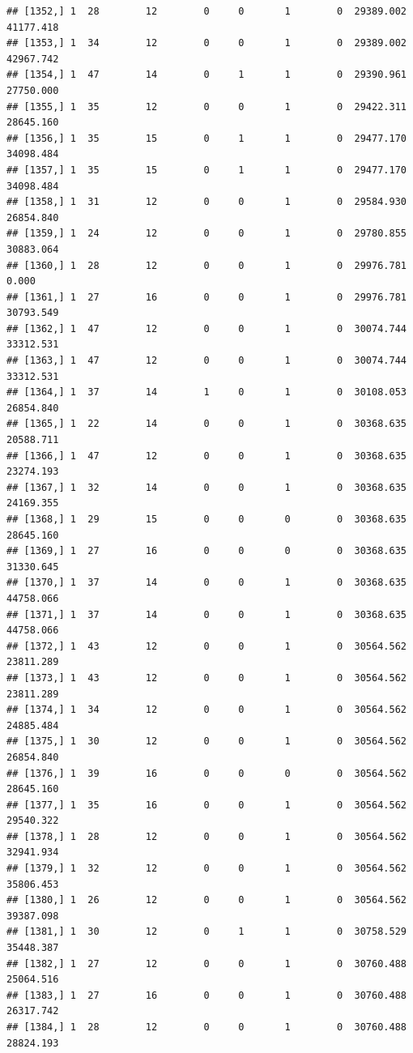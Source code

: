 \documentclass[
]{article}
\begin{document}
\begin{verbatim}
## [1352,] 1  28        12        0     0       1        0  29389.002  41177.418
## [1353,] 1  34        12        0     0       1        0  29389.002  42967.742
## [1354,] 1  47        14        0     1       1        0  29390.961  27750.000
## [1355,] 1  35        12        0     0       1        0  29422.311  28645.160
## [1356,] 1  35        15        0     1       1        0  29477.170  34098.484
## [1357,] 1  35        15        0     1       1        0  29477.170  34098.484
## [1358,] 1  31        12        0     0       1        0  29584.930  26854.840
## [1359,] 1  24        12        0     0       1        0  29780.855  30883.064
## [1360,] 1  28        12        0     0       1        0  29976.781      0.000
## [1361,] 1  27        16        0     0       1        0  29976.781  30793.549
## [1362,] 1  47        12        0     0       1        0  30074.744  33312.531
## [1363,] 1  47        12        0     0       1        0  30074.744  33312.531
## [1364,] 1  37        14        1     0       1        0  30108.053  26854.840
## [1365,] 1  22        14        0     0       1        0  30368.635  20588.711
## [1366,] 1  47        12        0     0       1        0  30368.635  23274.193
## [1367,] 1  32        14        0     0       1        0  30368.635  24169.355
## [1368,] 1  29        15        0     0       0        0  30368.635  28645.160
## [1369,] 1  27        16        0     0       0        0  30368.635  31330.645
## [1370,] 1  37        14        0     0       1        0  30368.635  44758.066
## [1371,] 1  37        14        0     0       1        0  30368.635  44758.066
## [1372,] 1  43        12        0     0       1        0  30564.562  23811.289
## [1373,] 1  43        12        0     0       1        0  30564.562  23811.289
## [1374,] 1  34        12        0     0       1        0  30564.562  24885.484
## [1375,] 1  30        12        0     0       1        0  30564.562  26854.840
## [1376,] 1  39        16        0     0       0        0  30564.562  28645.160
## [1377,] 1  35        16        0     0       1        0  30564.562  29540.322
## [1378,] 1  28        12        0     0       1        0  30564.562  32941.934
## [1379,] 1  32        12        0     0       1        0  30564.562  35806.453
## [1380,] 1  26        12        0     0       1        0  30564.562  39387.098
## [1381,] 1  30        12        0     1       1        0  30758.529  35448.387
## [1382,] 1  27        12        0     0       1        0  30760.488  25064.516
## [1383,] 1  27        16        0     0       1        0  30760.488  26317.742
## [1384,] 1  28        12        0     0       1        0  30760.488  28824.193

\end{verbatim}
\end{document}
